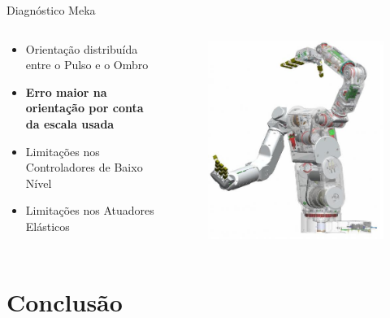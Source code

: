 \documentclass{beamer}
\begin{document}
\begin{frame}{Diagnóstico Meka}
\begin{columns}
\begin{column}{0.5\textwidth}
\begin{itemize}
    \item Orientação distribuída entre o Pulso e o Ombro
    \item \textbf{Erro maior na orientação por conta da escala usada}
    \item Limitações nos Controladores de Baixo Nível
    \item Limitações nos Atuadores Elásticos
\end{itemize}
\end{column}
\begin{column}{0.5\textwidth}  %
\begin{figure}
    \centering
    \includegraphics[width = \linewidth]{tex/figs/meka-inside.png}
\end{figure}
\end{column}
\end{columns}
\end{frame}

\section{Conclusão}
\end{document}
